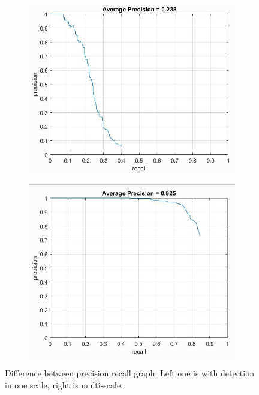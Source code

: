 \documentclass{article}
\begin{document}
\begin{figure}[!htb]
\begin{subfigure}{.48\textwidth}
  \centering
  \includegraphics[width=.99\textwidth]{no_scale.jpg}
\end{subfigure}
\begin{subfigure}{.48\textwidth}
  \centering
  \includegraphics[width=.99\textwidth]{step3.jpg}
\end{subfigure}
\caption{Difference between precision recall graph. Left one is with detection in one scale, right is multi-scale.}
\end{figure}
\end{document}
